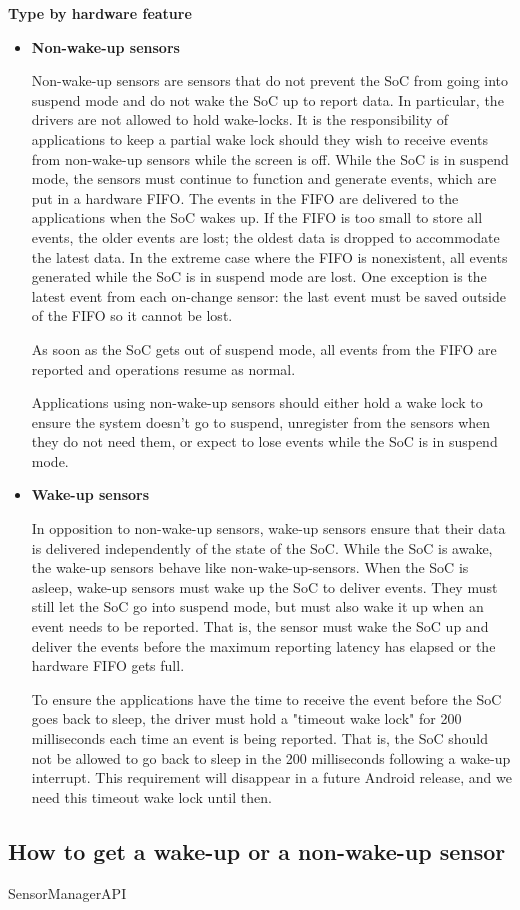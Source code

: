 \textbf{Type by hardware feature}
\begin{itemize}
\item \textbf{Non-wake-up sensors}

  Non-wake-up sensors are sensors that do not prevent the SoC from going into
  suspend mode and do not wake the SoC up to report data. In particular, the
  drivers are not allowed to hold wake-locks. It is the responsibility of
  applications to keep a partial wake lock should they wish to receive events
  from non-wake-up sensors while the screen is off. While the SoC is in suspend
  mode, the sensors must continue to function and generate events, which are put
  in a hardware FIFO.
  The events in the FIFO are delivered to the applications when the SoC wakes
  up. If the FIFO is too small to store all events, the older events are lost;
  the oldest data is dropped to accommodate the latest data. In the extreme case
  where the FIFO is nonexistent, all events generated while the SoC is in
  suspend mode are lost. One exception is the latest event from each on-change
  sensor: the last event must be saved outside of the FIFO so it cannot be lost.

  As soon as the SoC gets out of suspend mode, all events from the FIFO are
  reported and operations resume as normal.

  Applications using non-wake-up sensors should either hold a wake lock to
  ensure the system doesn't go to suspend, unregister from the sensors when they
  do not need them, or expect to lose events while the SoC is in suspend mode.

\item \textbf{Wake-up sensors}

  In opposition to non-wake-up sensors, wake-up sensors ensure that their data
  is delivered independently of the state of the SoC. While the SoC is awake,
  the wake-up sensors behave like non-wake-up-sensors. When the SoC is asleep,
  wake-up sensors must wake up the SoC to deliver events. They must still let
  the SoC go into suspend mode, but must also wake it up when an event needs to
  be reported. That is, the sensor must wake the SoC up and deliver the events
  before the maximum reporting latency has elapsed or the hardware FIFO gets
  full. %

  To ensure the applications have the time to receive the event before the SoC
  goes back to sleep, the driver must hold a "timeout wake lock" for 200
  milliseconds each time an event is being reported. That is, the SoC should not
  be allowed to go back to sleep in the 200 milliseconds following a wake-up
  interrupt. This requirement will disappear in a future Android release, and we
  need this timeout wake lock until then.
\end{itemize}

\subsection{How to get a wake-up or a non-wake-up sensor}

{SensorManagerAPI}



